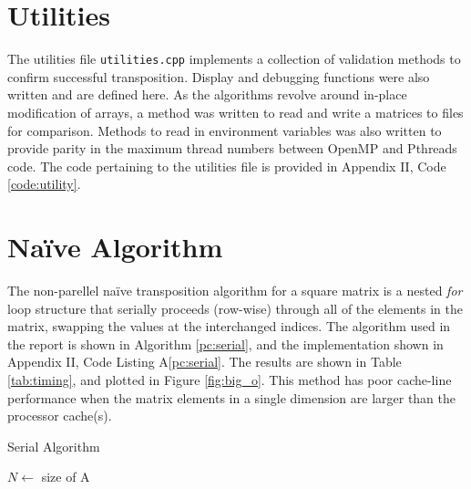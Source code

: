\documentclass[10 pt, conference]{cssconf}
\begin{document}
\begin{multicols}{2}
\section{Utilities}
The utilities file \verb|utilities.cpp| implements a collection of validation methods to confirm successful transposition. Display and debugging functions were also written and are defined here. As the algorithms revolve around in-place modification of arrays, a method was written to read and write a matrices to files for comparison. Methods to read in environment variables was also written to provide parity in the maximum thread numbers between OpenMP and Pthreads code. The code pertaining to the utilities file is provided in Appendix II, Code \ref{code:utility}.

\section{Na\"ive Algorithm}
The non-parellel na\"ive transposition algorithm for a square matrix is a nested \textit{for} loop structure that serially proceeds (row-wise) through all of the elements in the matrix, swapping the values at the interchanged indices. The algorithm used in the report is shown in Algorithm \ref{pc:serial}, and the implementation shown in Appendix II, Code Listing A\ref{pc:serial}. The results are shown in Table \ref{tab:timing}, and plotted in Figure \ref{fig:big_o}. This method has poor cache-line performance when the matrix elements in a single dimension are larger than the processor cache(s).

\vspace{5pt}
\begin{algorithm}[H]
    \small
    \caption{Serial Algorithm}\label{pc:serial}
    	\SetAlgoLined
	$N \leftarrow$ size of A
\end{algorithm}
\vspace{5pt}


\end{multicols}
\end{document}
